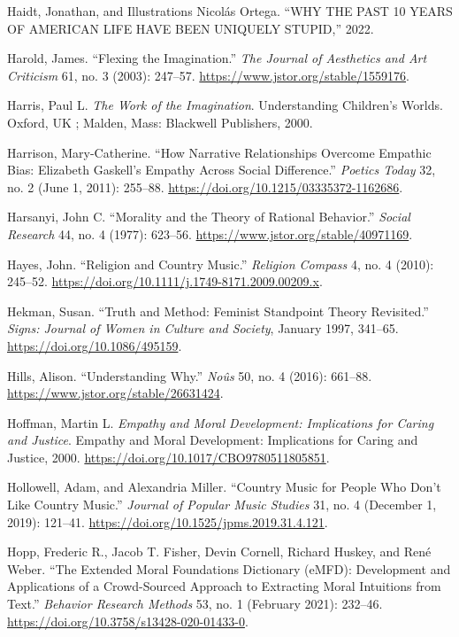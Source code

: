 \documentclass[phdthesis,12pt,final]{wuthesis}
\newlength{\cslhangindent}
\newenvironment{CSLReferences}[2] %
{\begin{list}{}{%
	\setlength{\itemindent}{0pt}
	\setlength{\leftmargin}{0pt}
	\setlength{\parsep}{0pt}
	\ifodd #1
	\setlength{\leftmargin}{\cslhangindent}
	\setlength{\itemindent}{-1\cslhangindent}
	\fi
	\setlength{\itemsep}{#2\baselineskip}}}
{\end{list}}
\theoremstyle{definition}
\theoremstyle{definition}
\theoremstyle{definition}
\theoremstyle{definition}
\theoremstyle{remark}
\begin{document}
\begin{CSLReferences}{1}{0}
Haidt, Jonathan, and Illustrations Nicolás Ortega. {``{WHY THE PAST} 10 {YEARS OF AMERICAN LIFE HAVE BEEN UNIQUELY STUPID},''} 2022.

Harold, James. {``Flexing the {Imagination}.''} \emph{The Journal of Aesthetics and Art Criticism} 61, no. 3 (2003): 247--57. \url{https://www.jstor.org/stable/1559176}.

Harris, Paul L. \emph{The {Work} of the {Imagination}}. Understanding {Children}'s {Worlds}. Oxford, UK ; Malden, Mass: Blackwell Publishers, 2000.

Harrison, Mary-Catherine. {``How {Narrative Relationships Overcome Empathic Bias}: {Elizabeth Gaskell}'s {Empathy} Across {Social Difference}.''} \emph{Poetics Today} 32, no. 2 (June 1, 2011): 255--88. \url{https://doi.org/10.1215/03335372-1162686}.

Harsanyi, John C. {``Morality and the {Theory} of {Rational Behavior}.''} \emph{Social Research} 44, no. 4 (1977): 623--56. \url{https://www.jstor.org/stable/40971169}.

Hayes, John. {``Religion and {Country Music}.''} \emph{Religion Compass} 4, no. 4 (2010): 245--52. \url{https://doi.org/10.1111/j.1749-8171.2009.00209.x}.

Hekman, Susan. {``Truth and Method: {Feminist} Standpoint Theory Revisited.''} \emph{Signs: Journal of Women in Culture and Society}, January 1997, 341--65. \url{https://doi.org/10.1086/495159}.

Hills, Alison. {``Understanding {Why}.''} \emph{Noûs} 50, no. 4 (2016): 661--88. \url{https://www.jstor.org/stable/26631424}.

Hoffman, Martin L. \emph{Empathy and Moral Development: {Implications} for Caring and Justice}. Empathy and Moral Development: {Implications} for Caring and Justice, 2000. \url{https://doi.org/10.1017/CBO9780511805851}.

Hollowell, Adam, and Alexandria Miller. {``Country {Music} for {People Who Don}'t {Like Country Music}.''} \emph{Journal of Popular Music Studies} 31, no. 4 (December 1, 2019): 121--41. \url{https://doi.org/10.1525/jpms.2019.31.4.121}.

Hopp, Frederic R., Jacob T. Fisher, Devin Cornell, Richard Huskey, and René Weber. {``The Extended {Moral Foundations Dictionary} ({eMFD}): {Development} and Applications of a Crowd-Sourced Approach to Extracting Moral Intuitions from Text.''} \emph{Behavior Research Methods} 53, no. 1 (February 2021): 232--46. \url{https://doi.org/10.3758/s13428-020-01433-0}.


\end{CSLReferences}
\end{document}
